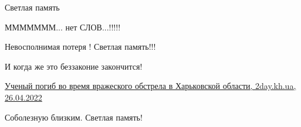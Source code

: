 \begin{itemize}
Светлая память

МММММММ... нет СЛОВ...!!!!!

Невосполнимая потеря ! Светлая память!!!

И когда же это беззаконие закончится!


\href{https://2day.kh.ua/kharkow/uchenyy-pogib-vo-vremya-vrazheskogo-obstrela-v-kharkovskoy-oblasti}{%
Ученый погиб во время вражеского обстрела в Харьковской области, 2day.kh.ua, 26.04.2022%
}

Соболезную близким. Светлая память!


\end{itemize} %
